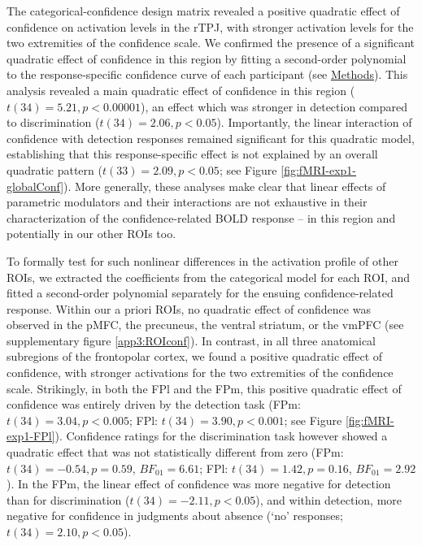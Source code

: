 \documentclass[12pt,twoside]{reedthesis}
\begin{document}
The categorical-confidence design matrix revealed a positive quadratic effect of confidence on activation levels in the rTPJ, with stronger activation levels for the two extremities of the confidence scale. We confirmed the presence of a significant quadratic effect of confidence in this region by fitting a second-order polynomial to the response-specific confidence curve of each participant (see \protect\hyperlink{categoricalDM}{Methods}). This analysis revealed a main quadratic effect of confidence in this region (\(t(34) = 5.21, p<0.00001\)), an effect which was stronger in detection compared to discrimination (\(t(34)=2.06, p<0.05\)). Importantly, the linear interaction of confidence with detection responses remained significant for this quadratic model, establishing that this response-specific effect is not explained by an overall quadratic pattern (\(t(33)=2.09, p<0.05\); see Figure \ref{fig:fMRI-exp1-globalConf}). More generally, these analyses make clear that linear effects of parametric modulators and their interactions are not exhaustive in their characterization of the confidence-related BOLD response -- in this region and potentially in our other ROIs too.

To formally test for such nonlinear differences in the activation profile of other ROIs, we extracted the coefficients from the categorical model for each ROI, and fitted a second-order polynomial separately for the ensuing confidence-related response. Within our a priori ROIs, no quadratic effect of confidence was observed in the pMFC, the precuneus, the ventral striatum, or the vmPFC (see supplementary figure \ref{app3:ROIconf}). In contrast, in all three anatomical subregions of the frontopolar cortex, we found a positive quadratic effect of confidence, with stronger activations for the two extremities of the confidence scale. Strikingly, in both the FPl and the FPm, this positive quadratic effect of confidence was entirely driven by the detection task (FPm: \(t(34)=3.04, p<0.005\); FPl: \(t(34)=3.90, p<0.001\); see Figure \ref{fig:fMRI-exp1-FPl}). Confidence ratings for the discrimination task however showed a quadratic effect that was not statistically different from zero (FPm: \(t(34)=-0.54, p=0.59\), \(BF_{01}=6.61\); FPl: \(t(34)=1.42, p=0.16\), \(BF_{01}=2.92\)). In the FPm, the linear effect of confidence was more negative for detection than for discrimination (\(t(34) = -2.11, p<0.05\)), and within detection, more negative for confidence in judgments about absence (`no' responses; \(t(34) = 2.10, p<0.05\)).
\end{document}
